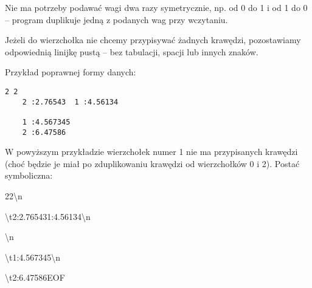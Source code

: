 \documentclass[]{article}
\begin{document}
Nie ma potrzeby podawać wagi dwa razy symetrycznie, np. od 0 do 1 i od 1 do 0 – program duplikuje jedną z podanych wag przy wczytaniu.

Jeżeli do wierzchołka nie chcemy przypisywać żadnych krawędzi, pozostawiamy odpowiednią linijkę pustą – bez tabulacji, spacji lub innych znaków.

Przykład poprawnej formy danych:
\begin{verbatim}
2 2
    2 :2.76543  1 :4.56134

    1 :4.567345
    2 :6.47586
\end{verbatim}
W powyższym przykładzie wierzchołek numer 1 nie ma przypisanych krawędzi (choć będzie je miał po zduplikowaniu krawędzi od wierzchołków 0 i 2).
Postać symboliczna:

2\texttt{\verbvisiblespace}2\textbackslash n

\textbackslash t2\texttt{\verbvisiblespace}:2.76543\texttt{\verbvisiblespace}\texttt{\verbvisiblespace}1\texttt{\verbvisiblespace}:4.56134\textbackslash n

\textbackslash n

\textbackslash t1\texttt{\verbvisiblespace}:4.567345\textbackslash n

\textbackslash t2\texttt{\verbvisiblespace}:6.47586EOF
\end{document}
